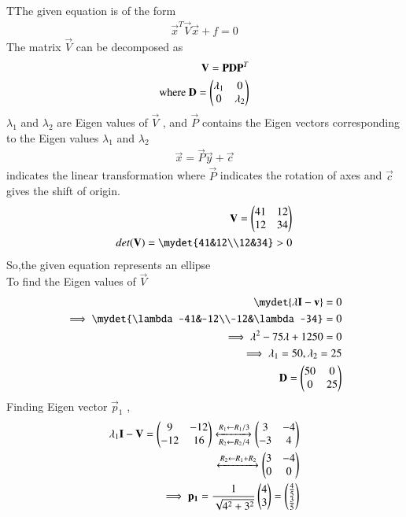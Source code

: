  
TThe given equation is of the form
\begin{align}
   \vec{x}^T\vec{V}\vec{x}+f=0
\end{align}
The matrix $\vec{V}$ can be decomposed as
\begin{align}
    \mathbf{V}=\mathbf{P}\mathbf{D}\mathbf{P}^T\label{eq:solutions/3/4/9/2}\\
    \text{where  }\mathbf{D}=\begin{pmatrix}\lambda_1&0\\0&\lambda_2\end{pmatrix}
\end{align}
$\lambda_1$ and $\lambda_2$ are Eigen values of $\vec{V}$ , and
$\vec{P}$ contains the Eigen vectors corresponding to the Eigen values $\lambda_1$ and $\lambda_2$
\begin{align}
\vec{x}=\vec{P}\vec{y}+\vec{c}
\end{align}
indicates the linear transformation where $\vec{P}$ indicates the rotation of axes and $\vec{c}$ gives the shift of origin.
\begin{align}
  \vec{V}=\myvec{41&12\\12&34}\\
  det(\vec{V} )=\mydet{41&12\\12&34}>0
\end{align}
So,the given equation represents an ellipse\\
To find the Eigen values of $\vec{V}$
\begin{align}
    \mydet{\lambda\vec{I}-\vec{v}}=0\\
    \implies \mydet{\lambda-41&-12\\-12&\lambda-34}=0\\
    \implies \lambda^2-75\lambda+1250=0\\
    \implies \lambda_1=50,\lambda_2=25\\
    \vec{D}=\myvec{50&0\\0&25}
\end{align}
Finding Eigen vector $\vec{p}_1$ ,
\begin{align}
\lambda_1\mathbf{I}-\mathbf{V}= \begin{pmatrix}9&-12\\-12&16\end{pmatrix}\xleftrightarrow[R_2\leftarrow R_2/4]{R_1\leftarrow R_1/3}\begin{pmatrix}3&-4\\-3&4\end{pmatrix}\\
\xleftrightarrow[]{R_2\leftarrow R_1+R_2}\begin{pmatrix}3&-4\\0&0\end{pmatrix}\\
\implies \mathbf{p_1}=\frac{1}{\sqrt{4^2+3^2}}\begin{pmatrix}4\\3\end{pmatrix}=\begin{pmatrix}\frac{4}{5}\\\frac{3}{5}\end{pmatrix}
\end{align}
